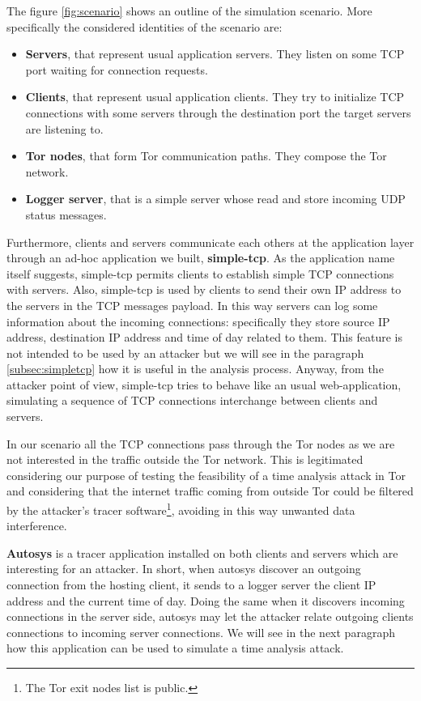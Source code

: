The figure \ref{fig:scenario} shows an outline of the simulation
scenario. More specifically the considered identities of the scenario are:
\begin{itemize} 
	\item \textbf{Servers}, that represent usual application servers.
They listen on some TCP port waiting for connection requests.
	\item \textbf{Clients}, that represent usual application clients.
They try to initialize TCP connections with some servers through the
destination port the target servers are listening to.
	\item \textbf{Tor nodes}, that form Tor communication paths. They
compose the Tor network.
	\item \textbf{Logger server}, that is a simple server whose read
and store incoming UDP status messages.
\end{itemize}

Furthermore, clients and servers communicate each others at the application layer
through an ad-hoc application we built, \textbf{simple-tcp}. As the
application name itself suggests, simple-tcp permits clients to
establish simple TCP connections with servers. Also, simple-tcp is used
by clients to send their own IP address to the servers in the TCP
messages payload.
In this way servers can log some information about the incoming connections:
specifically they store source IP address,
destination IP address and time of day related to them. 
This feature is not intended to be used by an attacker but
we will see in the paragraph \ref{subsec:simpletcp} how
it is useful in the analysis process. Anyway, from the attacker point of
view, simple-tcp tries to behave like an usual web-application,
simulating a sequence of TCP connections interchange between clients and
servers. 

In our scenario all the TCP connections pass through the Tor
nodes as we are not interested in the traffic outside the Tor network. 
This is legitimated considering our purpose of testing the feasibility of a time analysis
attack in Tor and considering that the internet traffic coming from
outside Tor could be filtered by the attacker's tracer
software\footnote{The Tor exit nodes list is public\cite{toroverview}.}, avoiding in this
way unwanted data interference.

\textbf{Autosys} is a tracer application installed on both clients and
servers which are interesting for an attacker.  
In short, when autosys discover an outgoing connection from the
hosting client, it sends to a logger server the client IP address and
the current time of day. Doing the same when it discovers incoming
connections in the server side, autosys may let the attacker relate outgoing
clients connections 
 to incoming server connections. We will see in the next
paragraph how this application can be used to simulate a time analysis
attack.
